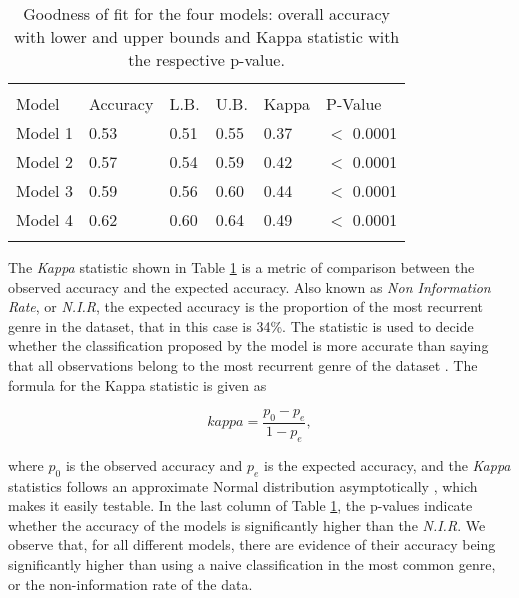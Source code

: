 \documentclass[twocolumn]{article}
\begin{document}
\begin{table}[ht]
\caption{Goodness of fit
for the four models: overall accuracy with lower and upper bounds and Kappa statistic with the respective p-value.}
\centering
\vspace{3mm}
\begin{tabular}{llllll}
\\[-1.8ex]\hline 
\hline \\[-1.8ex] 
 
Model & Accuracy & L.B. & U.B. & Kappa & P-Value \\ 
  \hline
  Model 1    & 0.53 & 0.51 & 0.55 & 0.37 & $<$ 0.0001 \\
  Model 2    & 0.57 & 0.54 & 0.59 & 0.42 & $<$ 0.0001 \\
  Model 3    & 0.59 & 0.56 & 0.60 & 0.44 & $<$ 0.0001 \\
  Model 4    & 0.62 & 0.60 & 0.64 & 0.49 & $<$ 0.0001 \\
\hline \hline  \\[-1.8ex] 
\end{tabular}
\label{tab:qual}

\end{table}

The \textit{Kappa} statistic shown in Table
\ref{tab:qual} is a metric of 
comparison between the observed accuracy
and the expected accuracy. Also known as
\textit{Non Information Rate}, or \textit{N.I.R},
the expected accuracy is the proportion of the 
most recurrent genre in the dataset, that in 
this case is 34\%.  The statistic is 
used to decide whether the classification
proposed by the model is more accurate 
than saying that all observations belong
to the most recurrent genre of the dataset
\cite{Cohen1960}. The formula
for the Kappa statistic is given 
as 

\begin{equation}
kappa = \frac{p_{0} - p_{e} }{1 - p_{e}},
\label{eq:kappa}
\end{equation}

where $p_{0}$ is the observed accuracy
and $p_{e}$ is the expected accuracy, and 
the \textit{Kappa} statistics follows an 
approximate Normal distribution asymptotically
\cite{Cohen1960}, which makes it easily 
testable. In the last column of Table \ref{tab:qual},
the p-values indicate whether 
the accuracy of the models is significantly
higher than the \textit{N.I.R}. We observe
that, for all different models, there are
evidence of their accuracy being 
significantly higher than using a naive
classification in the most common genre, 
or the non-information rate of the data.
\end{document}
